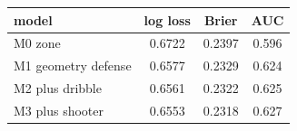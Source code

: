 \begin{tabular}{lccc}
\hline
model & log loss & Brier & AUC \\
\hline
M0 zone & 0.6722 & 0.2397 & 0.596 \\
M1 geometry defense & 0.6577 & 0.2329 & 0.624 \\
M2 plus dribble & 0.6561 & 0.2322 & 0.625 \\
M3 plus shooter & 0.6553 & 0.2318 & 0.627 \\
\hline
\end{tabular}
